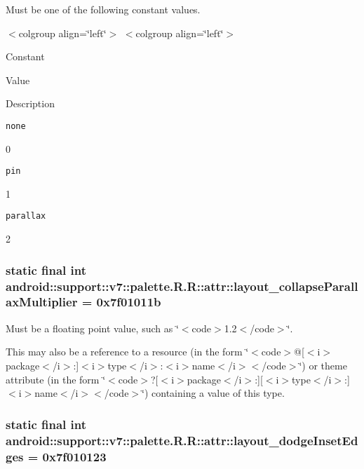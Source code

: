 Must be one of the following constant values. \begin{TabularC}{0}
\hline
\end{TabularC}
$<$colgroup align=\char`\"{}left\char`\"{}$>$ $<$colgroup align=\char`\"{}left\char`\"{}$>$ 

Constant

Value

Description 

{\tt none}

0

{\tt pin}

1

{\tt parallax}

2\hypertarget{classandroid_1_1support_1_1v7_1_1palette_1_1_r_1_1attr_5a7bf9a2d750003b7eaa8d2aff9942dd}{
\subsubsection[{layout\_\-collapseParallaxMultiplier}]{\setlength{\rightskip}{0pt plus 5cm}static final int android::support::v7::palette.R.R::attr::layout\_\-collapseParallaxMultiplier = 0x7f01011b}}
\label{classandroid_1_1support_1_1v7_1_1palette_1_1_r_1_1attr_5a7bf9a2d750003b7eaa8d2aff9942dd}


Must be a floating point value, such as \char`\"{}$<$code$>$1.2$<$/code$>$\char`\"{}. 

This may also be a reference to a resource (in the form \char`\"{}$<$code$>$@\mbox{[}$<$i$>$package$<$/i$>$:\mbox{]}$<$i$>$type$<$/i$>$:$<$i$>$name$<$/i$>$$<$/code$>$\char`\"{}) or theme attribute (in the form \char`\"{}$<$code$>$?\mbox{[}$<$i$>$package$<$/i$>$:\mbox{]}\mbox{[}$<$i$>$type$<$/i$>$:\mbox{]}$<$i$>$name$<$/i$>$$<$/code$>$\char`\"{}) containing a value of this type. \hypertarget{classandroid_1_1support_1_1v7_1_1palette_1_1_r_1_1attr_79d7872d98a759180a3ae11196fff731}{
\subsubsection[{layout\_\-dodgeInsetEdges}]{\setlength{\rightskip}{0pt plus 5cm}static final int android::support::v7::palette.R.R::attr::layout\_\-dodgeInsetEdges = 0x7f010123}}
\label{classandroid_1_1support_1_1v7_1_1palette_1_1_r_1_1attr_79d7872d98a759180a3ae11196fff731}



